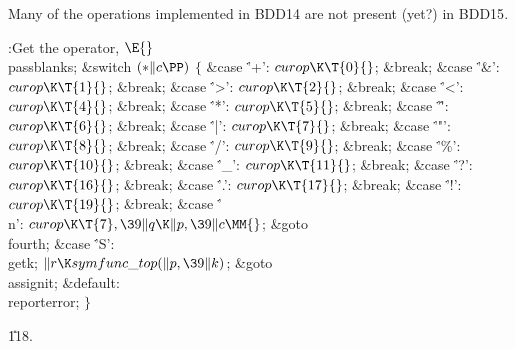 Many of the operations implemented in {\mc BDD14} are not
present
(yet?) in {\mc BDD15}.

\Y\B\4:Get the operator, \X${}\E{}$\6
\\{passblanks};\6
\&{switch} ${}({*}\|c\PP){}$\5
${}\{{}$\1\6
\4\&{case} \.{'+'}:\5
${}\\{curop}\K\T{0}{}$;\5
\&{break};\6
\4\&{case} \.{'\&'}:\5
${}\\{curop}\K\T{1}{}$;\5
\&{break};\6
\4\&{case} \.{'>'}:\5
${}\\{curop}\K\T{2}{}$;\5
\&{break};\6
\4\&{case} \.{'<'}:\5
${}\\{curop}\K\T{4}{}$;\5
\&{break};\6
\4\&{case} \.{'*'}:\5
${}\\{curop}\K\T{5}{}$;\5
\&{break};\6
\4\&{case} \.{'\^'}:\5
${}\\{curop}\K\T{6}{}$;\5
\&{break};\6
\4\&{case} \.{'|'}:\5
${}\\{curop}\K\T{7}{}$;\5
\&{break};\6
\4\&{case} \.{'"'}:\5
${}\\{curop}\K\T{8}{}$;\5
\&{break};\6
\4\&{case} \.{'/'}:\5
${}\\{curop}\K\T{9}{}$;\5
\&{break};\6
\4\&{case} \.{'\%'}:\5
${}\\{curop}\K\T{10}{}$;\5
\&{break};\6
\4\&{case} \.{'\_'}:\5
${}\\{curop}\K\T{11}{}$;\5
\&{break};\6
\4\&{case} \.{'?'}:\5
${}\\{curop}\K\T{16}{}$;\5
\&{break};\6
\4\&{case} \.{'.'}:\5
${}\\{curop}\K\T{17}{}$;\5
\&{break};\6
\4\&{case} \.{'!'}:\5
${}\\{curop}\K\T{19}{}$;\5
\&{break};\6
\4\&{case} \.{'\\n'}:\5
${}\\{curop}\K\T{7},\39\|q\K\|p,\39\|c\MM{}$;\5
\&{goto} \\{fourth};\6
\4\&{case} \.{'S'}:\5
\\{getk};\5
${}\|r\K\\{symfunc\_top}(\|p,\39\|k){}$;\5
\&{goto} \\{assignit};\6
\4\&{default}:\5
\\{reporterror};\6
\4${}\}{}$\2\par
\U118.\fi


